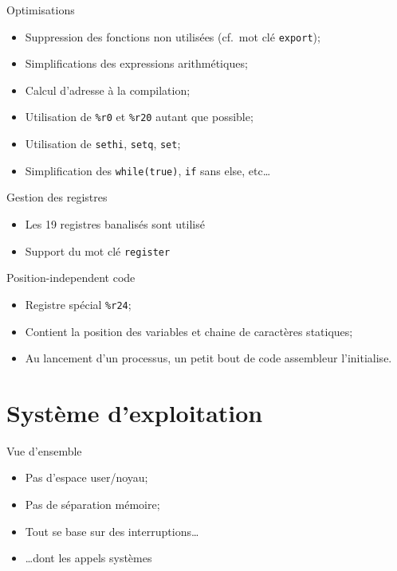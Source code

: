 \documentclass{beamer}
\begin{document}
    \begin{frame}[fragile]{Optimisations}
      \begin{itemize}
        \item Suppression des fonctions non utilisées (cf.\ mot clé
          \verb+export+);
        \item Simplifications des expressions arithmétiques;
        \item Calcul d'adresse à la compilation;
        \item Utilisation de \verb+%r0+ et \verb+%r20+ autant que possible;
        \item Utilisation de \verb+sethi+, \verb+setq+, \verb+set+;
        \item Simplification des \verb+while(true)+, \verb+if+ sans else, etc…
      \end{itemize}
\end{frame}

    \begin{frame}[fragile]{Gestion des registres}
      \begin{itemize}
        \item Les 19 registres banalisés sont utilisé
        \item Support du mot clé \verb+register+
      \end{itemize}
\end{frame}

  \begin{frame}[fragile]{Position-independent code}
    \begin{itemize}
      \item Registre spécial \verb+%r24+;
      \item Contient la position des variables et chaine de caractères statiques;
      \item Au lancement d'un processus, un petit bout de code assembleur l'initialise.
    \end{itemize}
\end{frame}

  \section{Système d'exploitation}
    \begin{frame}[fragile]{Vue d'ensemble}
      \begin{itemize}
        \item Pas d'espace user/noyau;
        \item Pas de séparation mémoire;
        \item Tout se base sur des interruptions\dots
        \item \dots dont les appels systèmes
      \end{itemize}
\end{frame}
\end{document}

